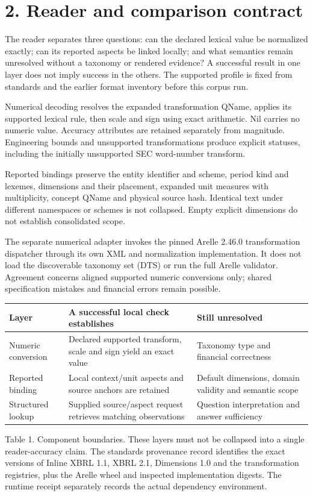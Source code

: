 \documentclass[10pt,a4paper]{article}
\begin{document}
\clearpage
\section*{2. Reader and comparison contract}
The reader separates three questions: can the declared lexical value be normalized exactly; can its reported aspects be linked locally; and what semantics remain unresolved without a taxonomy or rendered evidence? A successful result in one layer does not imply success in the others. The supported profile is fixed from standards and the earlier format inventory before this corpus run.

Numerical decoding resolves the expanded transformation QName, applies its supported lexical rule, then scale and sign using exact arithmetic. Nil carries no numeric value. Accuracy attributes are retained separately from magnitude. Engineering bounds and unsupported transformations produce explicit statuses, including the initially unsupported SEC word-number transform.

Reported bindings preserve the entity identifier and scheme, period kind and lexemes, dimensions and their placement, expanded unit measures with multiplicity, concept QName and physical source hash. Identical text under different namespaces or schemes is not collapsed. Empty explicit dimensions do not establish consolidated scope.

The separate numerical adapter invokes the pinned Arelle 2.46.0 transformation dispatcher through its own XML and normalization implementation. It does not load the discoverable taxonomy set (DTS) or run the full Arelle validator. Agreement concerns aligned supported numeric conversions only; shared specification mistakes and financial errors remain possible.

\begin{longtable}{@{}p{}p{}p{}@{}}\toprule
\textbf{Layer} & \textbf{A successful local check establishes} & \textbf{Still unresolved} \\ \midrule\endhead
Numeric conversion & Declared supported transform, scale and sign yield an exact value & Taxonomy type and financial correctness \\
Reported binding & Local context/unit aspects and source anchors are retained & Default dimensions, domain validity and semantic scope \\
Structured lookup & Supplied source/aspect request retrieves matching observations & Question interpretation and answer sufficiency \\
\bottomrule\end{longtable}
{\small Table 1. Component boundaries. These layers must not be collapsed into a single reader-accuracy claim.}
The standards provenance record identifies the exact versions of Inline XBRL 1.1, XBRL 2.1, Dimensions 1.0 and the transformation registries, plus the Arelle wheel and inspected implementation digests. The runtime receipt separately records the actual dependency environment.
\end{document}

